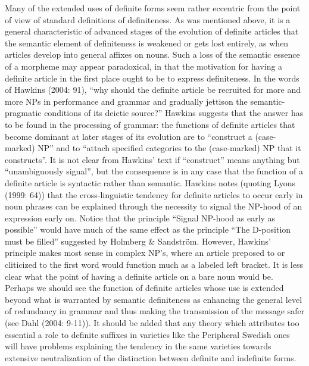 Many of the extended uses of definite forms seem rather eccentric from the point of view of standard definitions of definiteness. As was mentioned above, it is a general characteristic of advanced stages of the evolution of definite articles that the semantic element of definiteness is weakened or gets lost entirely, as when articles develop into general affixes on nouns. Such a loss of the semantic essence of a morpheme may appear paradoxical, in that the motivation for having a definite article in the first place ought to be to express definiteness. In the words of Hawkins (2004: 91), “why should the definite article be recruited for more and more NPs in performance and grammar and gradually jettison the semantic-pragmatic conditions of its deictic source?”  Hawkins suggests that the answer has to be found in the processing of grammar: the functions of definite articles that become dominant at later stages of its evolution are to “construct a (case-marked) NP” and to “attach specified categories to the (case-marked) NP that it constructs”. It is not clear from Hawkins’ text if “construct” means anything but “unambiguously signal”, but the consequence is in any case that the function of a definite article is syntactic rather than semantic. Hawkins notes (quoting Lyons (1999: 64)) that the cross-linguistic tendency for definite articles to occur early in noun phrases can be explained through the necessity to signal the NP-hood of an expression early on. Notice that the principle “Signal NP-hood as early as possible” would have much of the same effect as the principle “The D-position must be filled” suggested by Holmberg \& Sandström. However, Hawkins’ principle makes most sense in complex NP’s, where an article preposed to or cliticized to the first word would function much as a labeled left bracket. It is less clear what the point of having a definite article on a bare noun would be. Perhaps we should see the function of definite articles whose use is extended beyond what is warranted by semantic definiteness as enhancing the general level of redundancy in grammar and thus making the transmission of the message safer (see Dahl (2004: 9-11)). It should be added that any theory which attributes too essential a role to definite suffixes in varieties like the Peripheral Swedish ones will have problems explaining the tendency in the same varieties towards extensive neutralization of the distinction between definite and indefinite forms. 

